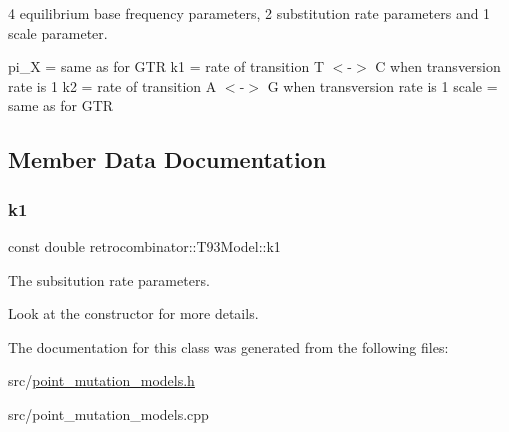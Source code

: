 4 equilibrium base frequency parameters, 2 substitution rate parameters and 1 scale parameter. 

pi\+\_\+X = same as for G\+TR k1 = rate of transition T $<$-\/$>$ C when transversion rate is 1 k2 = rate of transition A $<$-\/$>$ G when transversion rate is 1 scale = same as for G\+TR 

\subsection{Member Data Documentation}
\mbox{\label{classretrocombinator_1_1T93Model_a6844211aebb1deb555fa6f9b11b9d395}} 
\subsubsection{\texorpdfstring{k1}{k1}}
{\footnotesize\ttfamily const double retrocombinator\+::\+T93\+Model\+::k1\hspace{0.3cm}{\ttfamily [protected]}}



The subsitution rate parameters. 

Look at the constructor for more details. 

The documentation for this class was generated from the following files\+:\begin{DoxyCompactItemize}
\item 
src/\hyperlink{point__mutation__models_8h}{point\+\_\+mutation\+\_\+models.\+h}\item 
src/point\+\_\+mutation\+\_\+models.\+cpp\end{DoxyCompactItemize}
